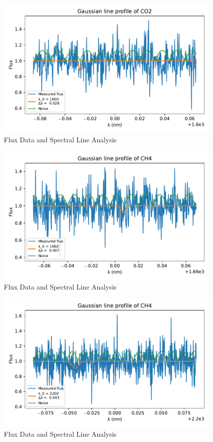 \documentclass[reprint,english,notitlepage]{revtex4-2}
\begin{document}
\begin{figure}[h!]
  \centering
  \includegraphics[scale =.5]{Figures/CO2 1600.pdf}
  \caption{Flux Data and Spectral Line Analysis}
  \label{fig: CO2 1600}
\end{figure}

\begin{figure}[h!]
  \centering
  \includegraphics[scale =.5]{Figures/CH4 1660.pdf}
  \caption{Flux Data and Spectral Line Analysis}
  \label{fig: CH4 1660}
\end{figure}

\begin{figure}[h!]
  \centering
  \includegraphics[scale =.5]{Figures/CH4 2200.pdf}
  \caption{Flux Data and Spectral Line Analysis}
  \label{fig: CH4 2200}
\end{figure}
\end{document}
